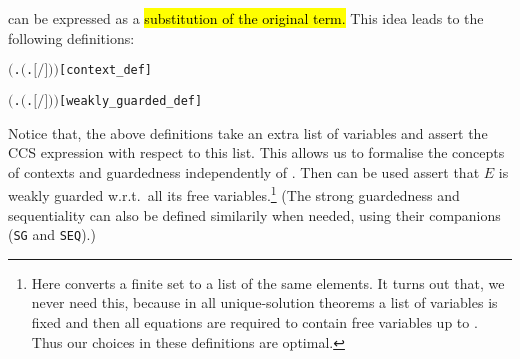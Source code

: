 can be expressed as a \univariate \hl{substitution of the original term.}
This idea leads to the following definitions:
\begin{alltt}
      \HOLSymConst{\HOLTokenDefEquality{}}  \ensuremath{(}\HOLTokenLambda{}.  \ensuremath{(}\HOLTokenLambda{}. \ensuremath{[}\ensuremath{/}\ensuremath{]} \ensuremath{)}\ensuremath{)} \hfill{[context_def]}

      \HOLSymConst{\HOLTokenDefEquality{}}  \ensuremath{(}\HOLTokenLambda{}.  \ensuremath{(}\HOLTokenLambda{}. \ensuremath{[}\ensuremath{/}\ensuremath{]} \ensuremath{)}\ensuremath{)} \hfill{[weakly_guarded_def]}
\end{alltt}
Notice that, the above definitions take an extra list of variables  and
assert the CCS expression  with respect to this list. This
allows us to formalise the concepts of contexts and guardedness
independently of . Then  can
be used assert that $E$ is weakly guarded w.r.t.~all its free
variables.\footnote{Here  converts a finite set
  to a list of the same elements. It turns out that, we never need this, because
  in all unique-solution theorems a list of variables  is fixed and
  then all equations are required to contain free variables up to
  . Thus our choices in these definitions are optimal.}
(The strong guardedness and sequentiality can also be defined similarily
when needed, using
their \univariate companions (\texttt{SG} and \texttt{SEQ}).)


